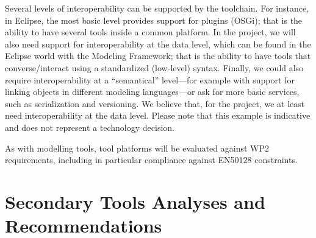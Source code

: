 \documentclass{template/openetcs_article}
\begin{document}
Several levels of interoperability can be supported by the
toolchain. For instance, in Eclipse, the most basic level
provides support for plugins (OSGi); that is the ability to have
several tools inside a common platform. In the project, we will also
need support for interoperability at the data level, which can be
found in the Eclipse world with the Modeling Framework; that is the
ability to have tools that converse/interact using a standardized
(low-level) syntax. Finally, we could also require interoperability at
a ``semantical'' level---for example with support for linking objects
in different modeling languages---or ask for more basic services, such
as serialization and versioning. We believe that, for the project, we
at least need interoperability at the data level. Please note that this 
example is indicative and does not represent a technology decision.

As with modelling tools, tool platforms will be evaluated against WP2 
requirements, including in particular compliance against EN50128 constraints.


\section{Secondary Tools Analyses and Recommendations}
\label{sec:supporting_tools}
\end{document}
